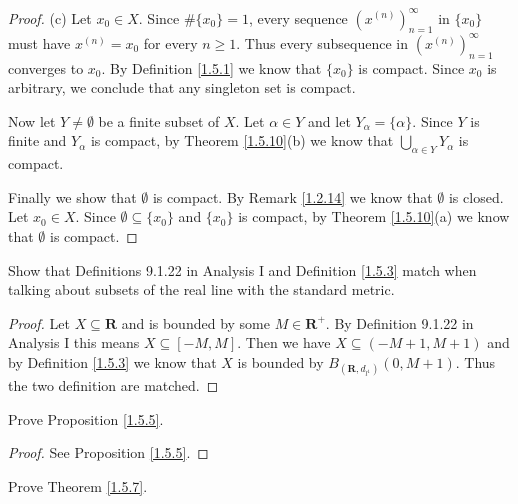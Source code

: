 \begin{proof}{(c)}
    Let \(x_0 \in X\).
    Since \(\#\{x_0\} = 1\), every sequence \((x^{(n)})_{n = 1}^\infty\) in \(\{x_0\}\) must have \(x^{(n)} = x_0\) for every \(n \geq 1\).
    Thus every subsequence in \((x^{(n)})_{n = 1}^\infty\) converges to \(x_0\).
    By Definition \ref{1.5.1} we know that \(\{x_0\}\) is compact.
    Since \(x_0\) is arbitrary, we conclude that any singleton set is compact.

    Now let \(Y \neq \emptyset\) be a finite subset of \(X\).
    Let \(\alpha \in Y\) and let \(Y_{\alpha} = \{\alpha\}\).
    Since \(Y\) is finite and \(Y_{\alpha}\) is compact, by Theorem \ref{1.5.10}(b) we know that \(\bigcup_{\alpha \in Y} Y_{\alpha}\) is compact.

    Finally we show that \(\emptyset\) is compact.
    By Remark \ref{1.2.14} we know that \(\emptyset\) is closed.
    Let \(x_0 \in X\).
    Since \(\emptyset \subseteq \{x_0\}\) and \(\{x_0\}\) is compact, by Theorem \ref{1.5.10}(a) we know that \(\emptyset\) is compact.
\end{proof}

\exercisesection

\begin{exercise}\label{ex 1.5.1}
    Show that Definitions 9.1.22 in Analysis I and Definition \ref{1.5.3} match when talking about subsets of the real line with the standard metric.
\end{exercise}

\begin{proof}
    Let \(X \subseteq \mathbf{R}\) and is bounded by some \(M \in \mathbf{R}^+\).
    By Definition 9.1.22 in Analysis I this means \(X \subseteq [-M, M]\).
    Then we have \(X \subseteq (-M + 1, M + 1)\) and by Definition \ref{1.5.3} we know that \(X\) is bounded by \(B_{(\mathbf{R}, d_{l^1})}(0, M + 1)\).
    Thus the two definition are matched.
\end{proof}

\begin{exercise}\label{ex 1.5.2}
    Prove Proposition \ref{1.5.5}.
\end{exercise}

\begin{proof}
    See Proposition \ref{1.5.5}.
\end{proof}

\begin{exercise}\label{ex 1.5.3}
    Prove Theorem \ref{1.5.7}.
\end{exercise}

